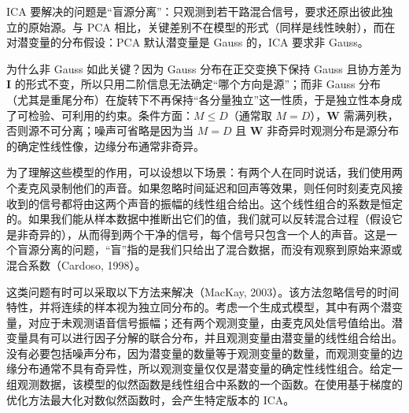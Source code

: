 \documentclass[../../main.tex]{subfiles}
\begin{document}
\begin{remark}
ICA 要解决的问题是“盲源分离”：只观测到若干路混合信号，要求还原出彼此独立的原始源。与 PCA 相比，关键差别不在模型的形式（同样是线性映射），而在对潜变量的分布假设：PCA 默认潜变量是 Gauss 的，ICA 要求非 Gauss。

为什么非 Gauss 如此关键？因为 Gauss 分布在正交变换下保持 Gauss 且协方差为 $\bm{I}$ 的形式不变，所以只用二阶信息无法确定“哪个方向是源”；而非 Gauss 分布（尤其是重尾分布）在旋转下不再保持“各分量独立”这一性质，于是独立性本身成了可检验、可利用的约束。条件方面：$M\leqslant D$（通常取 $M=D$），$\bm{W}$ 需满列秩，否则源不可分离；噪声可省略是因为当 $M=D$ 且 $\bm{W}$ 非奇异时观测分布是源分布的确定性线性像，边缘分布通常非奇异。
\end{remark}

\begin{example}[ 盲源分离]\label{example:ch16-盲源分离}
为了理解这些模型的作用，可以设想以下场景：有两个人在同时说话，我们使用两个麦克风录制他们的声音。如果忽略时间延迟和回声等效果，则任何时刻麦克风接收到的信号都将由这两个声音的振幅的线性组合给出。这个线性组合的系数是恒定的。如果我们能从样本数据中推断出它们的值，我们就可以反转混合过程（假设它是非奇异的），从而得到两个干净的信号，每个信号只包含一个人的声音。这是一个盲源分离的问题，“盲”指的是我们只给出了混合数据，而没有观察到原始来源或混合系数（Cardoso, 1998）。
\end{example}

这类问题有时可以采取以下方法来解决（MacKay, 2003）。该方法忽略信号的时间特性，并将连续的样本视为独立同分布的。考虑一个生成式模型，其中有两个潜变量，对应于未观测语音信号振幅；还有两个观测变量，由麦克风处信号值给出。潜变量具有可以进行因子分解的联合分布，并且观测变量由潜变量的线性组合给出。没有必要包括噪声分布，因为潜变量的数量等于观测变量的数量，而观测变量的边缘分布通常不具有奇异性，所以观测变量仅仅是潜变量的确定性线性组合。给定一组观测数据，该模型的似然函数是线性组合中系数的一个函数。在使用基于梯度的优化方法最大化对数似然函数时，会产生特定版本的 ICA。
\end{document}
